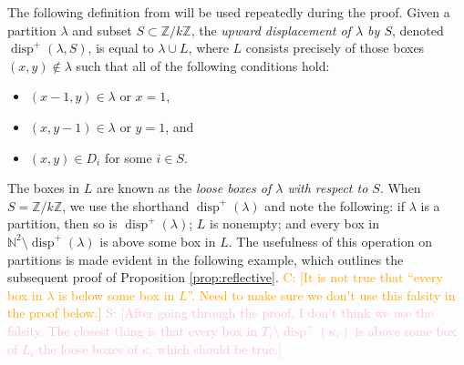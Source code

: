 \documentclass[11pt,reqno]{amsart}
\newcommand*{\N}{\mathbb{N}}
\newcommand*{\Z}{\mathbb{Z}}
\newcommand*{\disp}{\operatorname{disp}^{+}}
\newcommand{\caelan}[1]{\textcolor{orange}{\sf C: [#1]}}
\newcommand{\steven}[1]{\textcolor{pink}{\sf S: [#1]}}
\theoremstyle{definition}
\theoremstyle{problem}
\theoremstyle{plain}
\theoremstyle{remark}
\theoremstyle{theorem}
\numberwithin{equation}{section}
\numberwithin{figure}{section}
\begin{document}
The following definition from \cite{pflueger2017special} will be used
repeatedly during the proof. Given a partition $\lambda$ and subset
$S \subset \Z/k\Z$, the \textit{upward displacement of $\lambda$ by
  $S$}, denoted $\disp(\lambda, S)$, is equal to $\lambda \cup L$,
where $L$ consists precisely of those boxes $(x,y) \nin \lambda$ such
that all of the following conditions hold:
\begin{itemize}
\item $(x-1,y) \in \lambda$ or $x=1$,
\item $(x,y-1) \in \lambda$ or $y=1$, and
\item $(x,y) \in D_i$ for some $i \in S$.
\end{itemize}
The boxes in $L$ are known as the \textit{loose boxes of $\lambda$
  with respect to $S$}.  When $S = \Z/k\Z$, we use the shorthand
$\disp(\lambda)$ and note the following: if $\lambda$ is a partition,
then so is $\disp(\lambda)$; $L$ is nonempty; and every box in
$\N^2 \setminus \disp(\lambda)$ is above some box in $L$.  The
usefulness of this operation on partitions is made evident in the
following example, which outlines the subsequent proof of Proposition
\ref{prop:reflective}.  \caelan{It is not true that ``every box in
  $\lambda$ is below some box in $L$''.  Need to make sure we don't
  use this falsity in the proof below.}
  \steven{After going through the proof, I don't think we use the falsity.
  The closest thing is that every box in $T_r\setminus \disp(\kappa_i)$ 
  is above some box of $L_i$ the loose boxes of $\kappa_i$ which should
  be true.}
\end{document}
